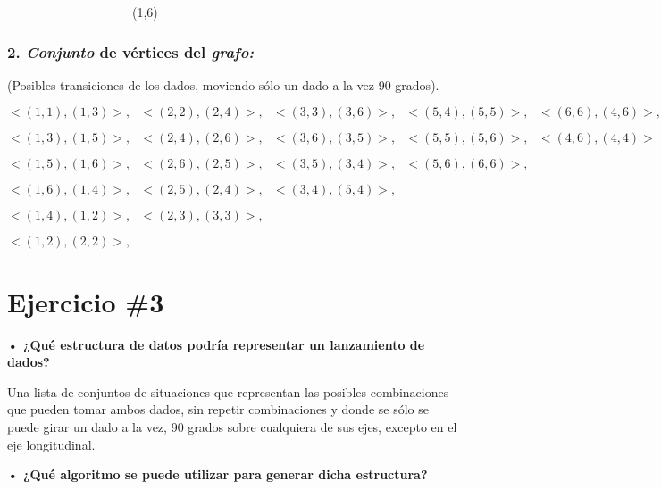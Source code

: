 \documentclass[11pt,letterpaper]{article}
\begin{document}
\ \ \ \ \ \ \ \ \ \ \ \ \ \ \ \ \ \ \ \ (1,6)

\subsubsection*{\textbf{2. \emph{Conjunto} de vértices del \emph{grafo:}}}

(Posibles transiciones de los dados, moviendo sólo un dado a la vez 90 grados).
\bigskip

\noindent$<(1,1),(1,3)>,\ \ \ <(2,2),(2,4)>,\ \ \ <(3,3),(3,6)>,\ \ \ <(5,4),(5,5)>,\ \ \ <(6,6),(4,6)>,$

\noindent$<(1,3),(1,5)>,\ \ \ <(2,4),(2,6)>,\ \ \ <(3,6),(3,5)>,\ \ \ <(5,5),(5,6)>,\ \ \ <(4,6),(4,4)>$

\noindent$<(1,5),(1,6)>,\ \ \ <(2,6),(2,5)>,\ \ \ <(3,5),(3,4)>,\ \ \ <(5,6),(6,6)>,$

\noindent$<(1,6),(1,4)>,\ \ \ <(2,5),(2,4)>,\ \ \ <(3,4),(5,4)>,$

\noindent$<(1,4),(1,2)>,\ \ \ <(2,3),(3,3)>,$

\noindent$<(1,2),(2,2)>,$

\pagebreak

\section*{\textbf{Ejercicio \#3}}
\textbf{• ¿Qué estructura de datos podría representar un lanzamiento de dados?}

\noindent Una lista de conjuntos de situaciones que representan las posibles combinaciones que pueden tomar ambos dados, sin repetir combinaciones y donde se sólo se puede girar un dado a la vez, 90 grados sobre cualquiera de sus ejes, excepto en el eje longitudinal. \bigskip

\textbf{• ¿Qué algoritmo se puede utilizar para generar dicha estructura?}
\end{document}
